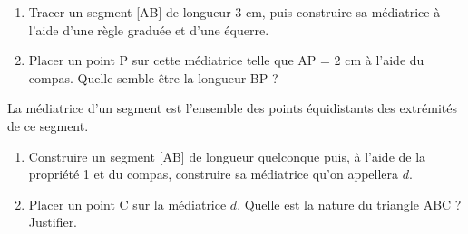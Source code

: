\documentclass[a4paper]{book}
\begin{document}
    \begin{exemple}
        \begin{enumerate}
            \item Tracer un segment [AB] de longueur 3 cm, puis construire sa médiatrice à l'aide d'une règle graduée et d'une équerre.

            \item Placer un point P sur cette médiatrice telle que AP = 2 cm à l'aide du compas. Quelle semble être la longueur BP ? 


            \vspace{3cm}
        \end{enumerate}
    \end{exemple}


    \begin{propriete}
        La médiatrice d'un segment est l'ensemble des points équidistants des extrémités de ce segment.
    \end{propriete}


\newpage


    \begin{exemple}
         \begin{enumerate}
             \item Construire un segment [AB] de longueur quelconque puis, à l'aide de la propriété 1 et du compas, construire sa médiatrice qu'on appellera $d$.

            \item Placer un point C sur la médiatrice $d$. Quelle est la nature du triangle ABC ? Justifier.
         \end{enumerate}
    \end{exemple}


    \begin{minipage}{0.4\linewidth}
        \text{ }
        
        \vspace{5cm}
    \end{minipage}
    \vline
    \hfill
    \begin{minipage}{0.55\linewidth}
    
    \end{minipage}
\end{document}
